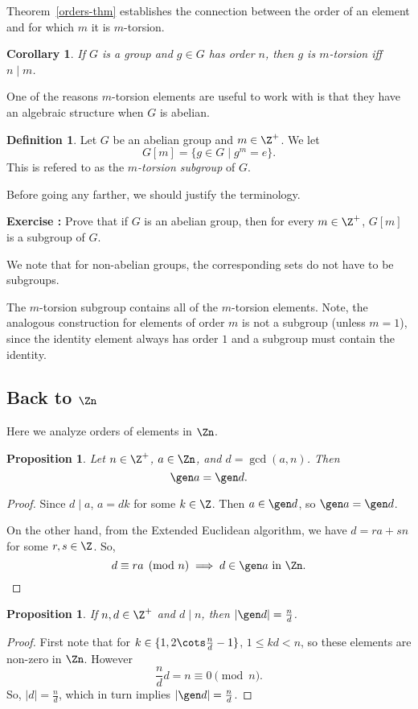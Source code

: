 \documentclass[12pt]{amsart}
\newcounter{probs}
\newenvironment{prob}{%
  \refstepcounter{probs}
  \par\medskip\noindent\textbf{Exercise \theprobs:} }{\par\medskip}
\theoremstyle{plain}
\newtheorem{prop}[thm]{Proposition}
\newtheorem{cor}[thm]{Corollary}
\theoremstyle{definition}
\newtheorem{defn}[thm]{Definition}
\theoremstyle{remark}
\begin{document}
Theorem~\ref{orders-thm} establishes the connection between the
order of an element and for which $m$ it is $m$-torsion.
\begin{cor}
  If $G$ is a group and $g\in G$ has order $n$, then $g$ is
  $m$-torsion iff $n \mid m$.
\end{cor}
One of the reasons $m$-torsion elements are useful to work with is
that they have an algebraic structure when $G$ is abelian.
\begin{defn}
  Let $G$ be an abelian group and $m\in\Z^+$.  We let
  \[ G[m] = \{g\in G\mid g^m=e\}.\]
  This is refered to as the \emph{$m$-torsion subgroup} of $G$.
\end{defn}
Before going any farther, we should justify the terminology.
\begin{prob}
  Prove that if $G$ is an abelian group, then for every $m\in\Z^+$,
  $G[m]$ is a subgroup of $G$.
\end{prob}
We note that for non-abelian groups, the corresponding sets do not
have to be subgroups.

The $m$-torsion subgroup contains all of the $m$-torsion elements.
Note, the analogous construction for elements of order $m$ is not a
subgroup (unless $m=1$), since the identity element always has order
$1$ and a subgroup must contain the identity.


\subsection{Back to $\Zn$}
Here we analyze orders of elements in $\Zn$.
\begin{prop} \label{imageszn}
  Let $n\in\Z^+$, $a\in \Zn$, and $d=\gcd(a,n)$.  Then
  \[ \gen a = \gen d.\]
\end{prop}
\begin{proof}
  Since $d\mid a$, $a=dk$ for some $k\in \Z$.  Then $a\in \gen d$, so
  $\gen a = \gen d$.

  On the other hand, from the Extended Euclidean algorithm, we have
  $d=ra+sn$ for some $r,s\in\Z$.  So, 
  \[ d\equiv ra\pmod n \implies d\in \gen a \text{ in $\Zn$.}\]
\end{proof}  
\begin{prop}
  If $n,d\in\Z^+$ and $d\mid n$, then $|\gen d|=\frac n d$.
\end{prop}
\begin{proof}
  First note that for $k\in \{1,2\cots \frac n d -1\}$, $1\leq kd <
  n$, so these elements are non-zero in $\Zn$.  However 
 \[ \frac n d d = n \equiv 0\pmod n.\]
  So, $|d|=\frac n d$, which in turn implies $|\gen d|=\frac n d$.
\end{proof}
\end{document}

